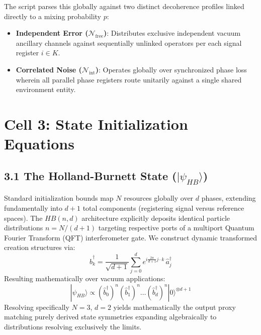 \documentclass[12pt]{article}
\begin{document}
The script parses this globally against two distinct decoherence profiles linked directly to a mixing probability $p$:
\begin{itemize}
    \item \textbf{Independent Error ($\mathcal{N}_{\text{free}}$)}: Distributes exclusive independent vacuum ancillary channels against sequentially unlinked operators per each signal register $i \in K$.
    \item \textbf{Correlated Noise ($\mathcal{N}_{\text{int}}$)}: Operates globally over synchronized phase loss wherein all parallel phase registers route unitarily against a single shared environment entity.
\end{itemize}

\section*{Cell 3: State Initialization Equations}

\subsection*{3.1 The Holland-Burnett State ($|\psi_{HB}\rangle$)}
Standard initialization bounds map $N$ resources globally over $d$ phases, extending fundamentally into $d+1$ total components (registering signal versus reference spaces). 
The $HB(n, d)$ architecture explicitly deposits identical particle distributions $n=N/(d+1)$ targeting respective ports of a multiport Quantum Fourier Transform (QFT) interferometer gate.
We construct dynamic transformed creation structures via:
\begin{equation}
    \hat{b}_k^{\dagger} = \frac{1}{\sqrt{d+1}}\sum_{j=0}^d e^{i\frac{2\pi}{d+1}j \cdot k} \, \hat{a}_j^{\dagger}
\end{equation}
Resulting mathematically over vacuum applications:
\begin{equation}
    |\psi_{HB}\rangle \propto (\hat{b}_0^\dagger)^n (\hat{b}_1^\dagger)^n \dots (\hat{b}_d^\dagger)^n |0\rangle^{\otimes d+1} 
\end{equation}
Resolving specifically $N=3$, $d=2$ yields mathematically the output proxy matching purely derived state symmetries expanding algebraically to distributions resolving exclusively the limits.
\end{document}
